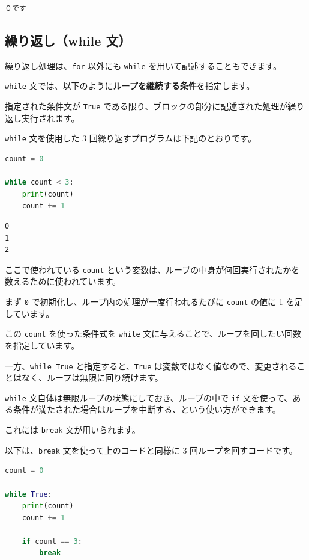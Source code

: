 \begin{lstlisting}[style=outputcell]
０です
\end{lstlisting}

\subsection{繰り返し（while 文）}


繰り返し処理は、\texttt{for} 以外にも \texttt{while} を用いて記述することもできます。

\texttt{while} 文では、以下のように\textbf{ループを継続する条件}を指定します。

指定された条件文が \texttt{True} である限り、ブロックの部分に記述された処理が繰り返し実行されます。




\texttt{while} 文を使用した 3 回繰り返すプログラムは下記のとおりです。


\begin{lstlisting}[style=codecell,language=Python]
count = 0

while count < 3:
    print(count)
    count += 1
\end{lstlisting}

\begin{lstlisting}[style=outputcell]
0
1
2
\end{lstlisting}

ここで使われている \texttt{count} という変数は、ループの中身が何回実行されたかを数えるために使われています。

まず \texttt{0} で初期化し、ループ内の処理が一度行われるたびに \texttt{count} の値に 1 を足しています。

この \texttt{count} を使った条件式を \texttt{while} 文に与えることで、ループを回したい回数を指定しています。


一方、\texttt{while True} と指定すると、\texttt{True} は変数ではなく値なので、変更されることはなく、ループは無限に回り続けます。

\texttt{while} 文自体は無限ループの状態にしておき、ループの中で \texttt{if} 文を使って、ある条件が満たされた場合はループを中断する、という使い方ができます。

これには \texttt{break} 文が用いられます。


以下は、\texttt{break} 文を使って上のコードと同様に 3 回ループを回すコードです。


\begin{lstlisting}[style=codecell,language=Python]
count = 0

while True:
    print(count)
    count += 1
    
    if count == 3:
        break
\end{lstlisting}

